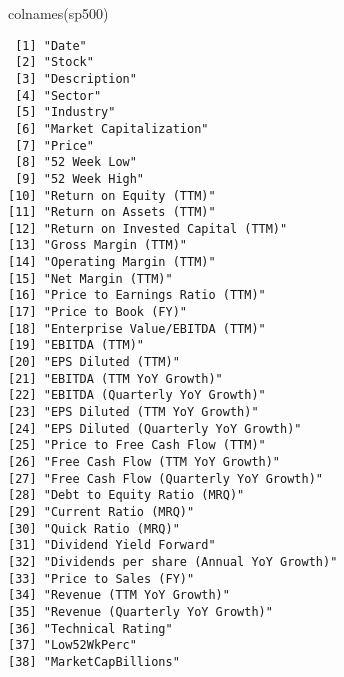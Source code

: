 \documentclass[
  letterpaper,
  DIV=11,
  numbers=noendperiod]{scrreport}
\newenvironment{Shaded}{\begin{snugshade}}{\end{snugshade}}
\newcommand{\FunctionTok}[1]{\textcolor[rgb]{0.28,0.35,0.67}{#1}}
\newcommand{\NormalTok}[1]{\textcolor[rgb]{0.00,0.23,0.31}{#1}}
\begin{document}
\begin{Shaded}
\begin{Highlighting}[]
\FunctionTok{colnames}\NormalTok{(sp500)}
\end{Highlighting}
\end{Shaded}

\begin{verbatim}
 [1] "Date"                                   
 [2] "Stock"                                  
 [3] "Description"                            
 [4] "Sector"                                 
 [5] "Industry"                               
 [6] "Market Capitalization"                  
 [7] "Price"                                  
 [8] "52 Week Low"                            
 [9] "52 Week High"                           
[10] "Return on Equity (TTM)"                 
[11] "Return on Assets (TTM)"                 
[12] "Return on Invested Capital (TTM)"       
[13] "Gross Margin (TTM)"                     
[14] "Operating Margin (TTM)"                 
[15] "Net Margin (TTM)"                       
[16] "Price to Earnings Ratio (TTM)"          
[17] "Price to Book (FY)"                     
[18] "Enterprise Value/EBITDA (TTM)"          
[19] "EBITDA (TTM)"                           
[20] "EPS Diluted (TTM)"                      
[21] "EBITDA (TTM YoY Growth)"                
[22] "EBITDA (Quarterly YoY Growth)"          
[23] "EPS Diluted (TTM YoY Growth)"           
[24] "EPS Diluted (Quarterly YoY Growth)"     
[25] "Price to Free Cash Flow (TTM)"          
[26] "Free Cash Flow (TTM YoY Growth)"        
[27] "Free Cash Flow (Quarterly YoY Growth)"  
[28] "Debt to Equity Ratio (MRQ)"             
[29] "Current Ratio (MRQ)"                    
[30] "Quick Ratio (MRQ)"                      
[31] "Dividend Yield Forward"                 
[32] "Dividends per share (Annual YoY Growth)"
[33] "Price to Sales (FY)"                    
[34] "Revenue (TTM YoY Growth)"               
[35] "Revenue (Quarterly YoY Growth)"         
[36] "Technical Rating"                       
[37] "Low52WkPerc"                            
[38] "MarketCapBillions"                      
\end{verbatim}
\end{document}
